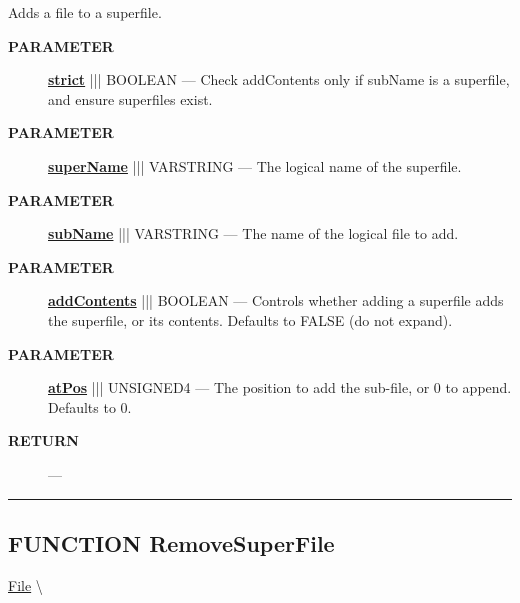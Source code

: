 \par





Adds a file to a superfile.






\par
\begin{description}
\item [\colorbox{tagtype}{\color{white} \textbf{\textsf{PARAMETER}}}] \textbf{\underline{strict}} ||| BOOLEAN --- Check addContents only if subName is a superfile, and ensure superfiles exist.
\item [\colorbox{tagtype}{\color{white} \textbf{\textsf{PARAMETER}}}] \textbf{\underline{superName}} ||| VARSTRING --- The logical name of the superfile.
\item [\colorbox{tagtype}{\color{white} \textbf{\textsf{PARAMETER}}}] \textbf{\underline{subName}} ||| VARSTRING --- The name of the logical file to add.
\item [\colorbox{tagtype}{\color{white} \textbf{\textsf{PARAMETER}}}] \textbf{\underline{addContents}} ||| BOOLEAN --- Controls whether adding a superfile adds the superfile, or its contents. Defaults to FALSE (do not expand).
\item [\colorbox{tagtype}{\color{white} \textbf{\textsf{PARAMETER}}}] \textbf{\underline{atPos}} ||| UNSIGNED4 --- The position to add the sub-file, or 0 to append. Defaults to 0.
\end{description}







\par
\begin{description}
\item [\colorbox{tagtype}{\color{white} \textbf{\textsf{RETURN}}}] \textbf{} --- 
\end{description}




\rule{\linewidth}{0.5pt}
\subsection*{\textsf{\colorbox{headtoc}{\color{white} FUNCTION}
RemoveSuperFile}}

\hypertarget{ecldoc:file.removesuperfile}{}
\hspace{0pt} \hyperlink{ecldoc:File}{File} \textbackslash 

